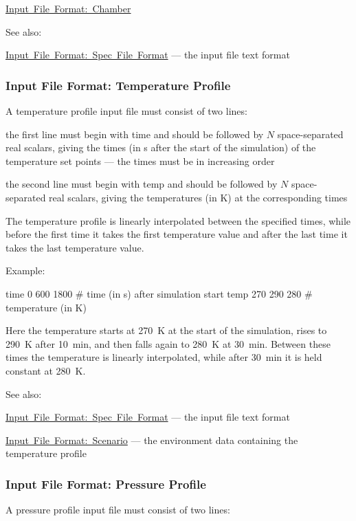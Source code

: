 \begin{DoxyItemize}
\begin{DoxyItemize}
\item \mbox{\hyperlink{input_format_chamber}{Input File Format\+: Chamber}} 
\end{DoxyItemize}
\end{DoxyItemize}

See also\+:
\begin{DoxyItemize}
\item \mbox{\hyperlink{spec_file_format}{Input File Format\+: Spec File Format}} --- the input file text format 
\end{DoxyItemize}\hypertarget{input_format_temp_profile}{}\subsubsection{Input File Format\+: Temperature Profile}\label{input_format_temp_profile}
A temperature profile input file must consist of two lines\+:


\begin{DoxyItemize}
\item the first line must begin with {\ttfamily time} and should be followed by $N$ space-\/separated real scalars, giving the times (in s after the start of the simulation) of the temperature set points --- the times must be in increasing order
\item the second line must begin with {\ttfamily temp} and should be followed by $N$ space-\/separated real scalars, giving the temperatures (in K) at the corresponding times
\end{DoxyItemize}

The temperature profile is linearly interpolated between the specified times, while before the first time it takes the first temperature value and after the last time it takes the last temperature value.

Example\+: 
\begin{DoxyPre}
 time  0    600  1800  \# time (in s) after simulation start
 temp  270  290  280   \# temperature (in K)
 \end{DoxyPre}
 Here the temperature starts at 270~K at the start of the simulation, rises to 290~K after 10~min, and then falls again to 280~K at 30~min. Between these times the temperature is linearly interpolated, while after 30~min it is held constant at 280~K.

See also\+:
\begin{DoxyItemize}
\item \mbox{\hyperlink{spec_file_format}{Input File Format\+: Spec File Format}} --- the input file text format
\item \mbox{\hyperlink{input_format_scenario}{Input File Format\+: Scenario}} --- the environment data containing the temperature profile 
\end{DoxyItemize}\hypertarget{input_format_pressure_profile}{}\subsubsection{Input File Format\+: Pressure Profile}\label{input_format_pressure_profile}
A pressure profile input file must consist of two lines\+:


